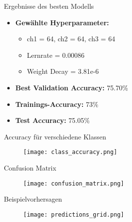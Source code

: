 \begin{frame}{Ergebnisse des besten Modells}

\begin{itemize}
    \item \textbf{Gewählte Hyperparameter:}
        \begin{itemize}
            \item ch1 = 64, ch2 = 64, ch3 = 64
            \item Lernrate = 0.00086
            \item Weight Decay = 3.81e-6
        \end{itemize}
    \item \textbf{Best Validation Accuracy:} \alert{75.70\%}
    
    \item \textbf{Trainings-Accuracy:} \alert{73\%}

    \item \textbf{Test Accuracy:} \alert{75.05\%}
\end{itemize}
\end{frame}


\begin{frame}{Accuracy für verschiedene Klassen}
    \begin{figure}
        \centering
        \texttt{[image: class\_accuracy.png]}
    \end{figure}
\end{frame}


\begin{frame}{Confusion Matrix}
    \begin{figure}
        \centering
        \texttt{[image: confusion\_matrix.png]}
    \end{figure}
\end{frame}


\begin{frame}{Beispielvorhersagen}
    \begin{figure}
        \centering
        \texttt{[image: predictions\_grid.png]}
    \end{figure}
\end{frame}

